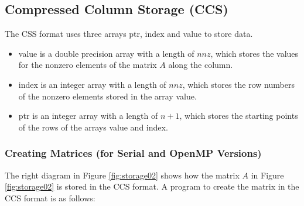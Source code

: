 \documentclass[a4paper]{article}
\begin{document}
\subsection{Compressed Column Storage (CCS)}
The CSS format uses three arrays {\ttfamily ptr}, {\ttfamily index} and
{\ttfamily value} to store data.
\begin{itemize}
\item {\ttfamily value} is a double precision array with a length of
      $nnz$, which stores the values for the nonzero elements of the matrix $A$ along the column.
\item {\ttfamily index} is an integer array with a length of $nnz$, which
      stores the row numbers of the nonzero elements stored in the
      array {\ttfamily value}.
\item {\ttfamily ptr} is an integer array with a length of $n+1$, which
      stores the starting points of the rows of the arrays {\ttfamily value} and {\ttfamily index}. 
\end{itemize}

\subsubsection{Creating Matrices (for Serial and OpenMP Versions)}
The right diagram in Figure \ref{fig:storage02} shows how the matrix $A$ in Figure \ref{fig:storage02} is stored in the CCS format. A program to create the matrix in the CCS format is as follows:
\end{document}
